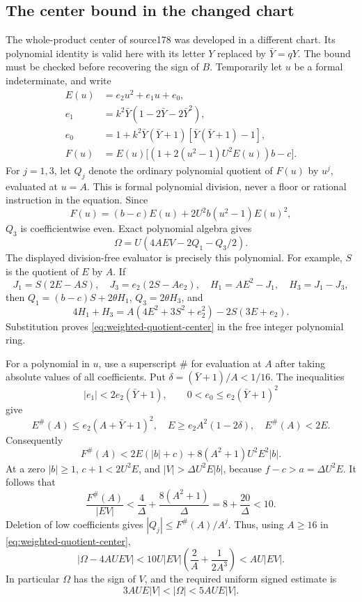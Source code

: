\subsection{The center bound in the changed chart}

The whole-product center of source178 was developed in a different chart.
Its polynomial identity is valid here with its letter $Y$ replaced by
$\bar Y=qY$. The bound must be checked before recovering the sign of $B$.
Temporarily let $u$ be a formal indeterminate, and write
\begin{align*}
 E(u)&=e_2u^2+e_1u+e_0,\\
 e_1&=k^2\bar Y(1-2\bar Y-2\bar Y^2),\\
 e_0&=1+k^2\bar Y(\bar Y+1)
                   [\bar Y(\bar Y+1)-1],\\
 F(u)&=E(u)\bigl[(1+2(u^2-1)U^2E(u))b-c\bigr].
\end{align*}
For $j=1,3$, let $Q_j$ denote the ordinary polynomial quotient of $F(u)$ by
$u^j$, evaluated at $u=A$. This is formal polynomial division, never a floor
or rational instruction in the equation. Since
\[
 F(u)=(b-c)E(u)+2U^2b(u^2-1)E(u)^2,
\]
$Q_3$ is coefficientwise even. Exact polynomial algebra gives
\begin{equation}
 \Omega=U(4AEV-2Q_1-Q_3/2).
 \label{eq:weighted-quotient-center}
\end{equation}
The displayed division-free evaluator is precisely this polynomial. For
example, $S$ is the quotient of $E$ by $A$. If
\[
 J_1=S(2E-AS),\quad J_3=e_2(2S-Ae_2),\quad
 H_1=AE^2-J_1,\quad H_3=J_1-J_3,
\]
then $Q_1=(b-c)S+2\theta H_1$, $Q_3=2\theta H_3$, and
\[
 4H_1+H_3=A(4E^2+3S^2+e_2^2)-2S(3E+e_2).
\]
Substitution proves \eqref{eq:weighted-quotient-center} in the free integer
polynomial ring.

For a polynomial in $u$, use a superscript $\#$ for evaluation at $A$ after
taking absolute values of all coefficients. Put
$\delta=(\bar Y+1)/A<1/16$. The inequalities
\[
 |e_1|<2e_2(\bar Y+1),\qquad
 0<e_0\le e_2(\bar Y+1)^2
\]
give
\[
 E^\#(A)\le e_2(A+\bar Y+1)^2,
 \quad E\ge e_2A^2(1-2\delta),\quad E^\#(A)<2E.
\]
Consequently
\[
 F^\#(A)<2E(|b|+c)+8(A^2+1)U^2E^2|b|.
\]
At a zero $|b|\ge1$, $c+1<2U^2E$, and
$|V|>\Delta U^2E|b|$, because $f-c>a=\Delta U^2E$.
It follows that
\[
 \frac{F^\#(A)}{|EV|}
 <\frac4\Delta+\frac{8(A^2+1)}\Delta
 =8+\frac{20}\Delta<10.
\]
Deletion of low coefficients gives $|Q_j|\le F^\#(A)/A^j$. Thus, using
$A\ge16$ in \eqref{eq:weighted-quotient-center},
\[
 |\Omega-4AUEV|
 <10U|EV|\left(\frac2A+\frac1{2A^3}\right)<AU|EV|.
\]
In particular $\Omega$ has the sign of $V$, and the required uniform signed
estimate is
\begin{equation}
 3AUE|V|<|\Omega|<5AUE|V|.
 \label{eq:weighted-center-bound}
\end{equation}

